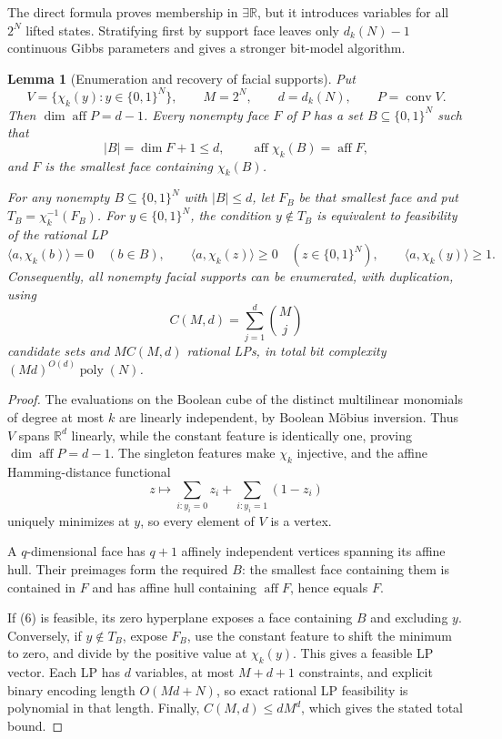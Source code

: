 \documentclass{article}
\newcommand{\bits}{\{0,1\}}
\newtheorem{lemma}{Lemma}
\begin{document}
The direct formula proves membership in $\exists\mathbb R$, but it introduces
variables for all $2^N$ lifted states.  Stratifying first by support face leaves
only $d_k(N)-1$ continuous Gibbs parameters and gives a stronger bit-model
algorithm.

\begin{lemma}[Enumeration and recovery of facial supports]
\label{lem:face-enumeration}
Put
\[
  V=\{\chi_k(y):y\in\bits^N\},\qquad
  M=2^N,\qquad d=d_k(N),\qquad P=\operatorname{conv}V.
\]
Then $\dim\operatorname{aff}P=d-1$.  Every nonempty face $F$ of $P$ has a
set $B\subseteq\bits^N$ such that
\[
  |B|=\dim F+1\le d,
  \qquad
  \operatorname{aff}\chi_k(B)=\operatorname{aff}F,
\]
and $F$ is the smallest face containing $\chi_k(B)$.

For any nonempty $B\subseteq\bits^N$ with $|B|\le d$, let $F_B$ be that
smallest face and put $T_B=\chi_k^{-1}(F_B)$.  For $y\in\bits^N$, the
condition $y\notin T_B$ is equivalent to feasibility of the rational LP
\[
  \langle a,\chi_k(b)\rangle=0\quad(b\in B),\qquad
  \langle a,\chi_k(z)\rangle\ge0\quad(z\in\bits^N),\qquad
  \langle a,\chi_k(y)\rangle\ge1.
  \tag{6}
\]
Consequently, all nonempty facial supports can be enumerated, with
duplication, using
\[
  C(M,d)=\sum_{j=1}^d\binom Mj
\]
candidate sets and $MC(M,d)$ rational LPs, in total bit complexity
$(Md)^{O(d)}\operatorname{poly}(N)$.
\end{lemma}

\begin{proof}
The evaluations on the Boolean cube of the distinct multilinear monomials of
degree at most $k$ are linearly independent, by Boolean M\"obius inversion.
Thus $V$ spans $\mathbb R^d$ linearly, while the constant feature is identically
one, proving $\dim\operatorname{aff}P=d-1$.  The singleton features make
$\chi_k$ injective, and the affine Hamming-distance functional
\[
  z\longmapsto
  \sum_{i:y_i=0}z_i+\sum_{i:y_i=1}(1-z_i)
\]
uniquely minimizes at $y$, so every element of $V$ is a vertex.

A $q$-dimensional face has $q+1$ affinely independent vertices spanning its
affine hull.  Their preimages form the required $B$: the smallest face
containing them is contained in $F$ and has affine hull containing
$\operatorname{aff}F$, hence equals $F$.

If (6) is feasible, its zero hyperplane exposes a face
containing $B$ and excluding $y$.  Conversely, if $y\notin T_B$, expose
$F_B$, use the constant feature to shift the minimum to zero, and divide by
the positive value at $\chi_k(y)$.  This gives a feasible LP vector.
Each LP has $d$ variables, at most $M+d+1$ constraints, and explicit binary
encoding length $O(Md+N)$, so exact rational LP feasibility is polynomial in
that length.  Finally, $C(M,d)\le dM^d$, which gives the stated total bound.
\end{proof}
\end{document}
